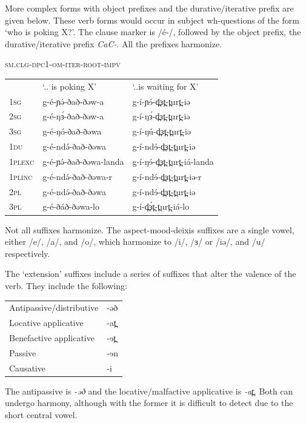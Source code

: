 More complex forms with object prefixes and the durative/iterative prefix are given below. These verb forms would occur in subject wh-questions of the form ‘who is poking X?’. The clause marker is /é-/, followed by the object prefix, the durative/iterative prefix \textit{CaC-}. All the prefixes harmonize. 

\ea \textsc{\textsc{sm.cl}g-dpc1-om-iter-root-impv}\\
\begin{tabular}[t]{lll}
&	‘.. is poking X’	&	‘..is waiting for X’\\
1\textsc{sg}	&	g-é-ɲə́-ðað-ðəw-a	&	g-í-ɲɘ́-d̪ɜt̪-t̪urt̪-iə\\
2\textsc{sg}	&	g-é-ŋɜ́-ðað-ðəw-a	&	g-í-ŋɜ́-d̪ɜt̪-t̪urt̪-iə\\
3\textsc{sg}	&	g-é-ŋó-ðað-ðəwa	&	g-í-ŋú-d̪ɜt̪-t̪urt̪-iə\\
1\textsc{du}	&	g-é-ndə́-ðað-ðəwa	&	g-í-ndɘ́-d̪ɜt̪-t̪urt̪-iə\\
1\textsc{plexc}	&	g-é-ɲə́-ðað-ðəwa-landa	&	g-í-ŋɘ́-d̪ɜt̪-t̪urt̪-iá-landa\\
1\textsc{plinc}	&	g-é-ndə́-ðað-ðəwa-r	&	g-í-ndɘ́-d̪ɜt̪-t̪urt̪-iə-r\\
2\textsc{pl}	&	g-é-ndə́-ðað-ðəwa	&	g-í-ndɘ́-d̪ɜt̪-t̪urt̪-iə\\
3\textsc{pl}	&	g-é-ðáð-ðəwa-lo	&	g-í-d̪ɜ́t̪-t̪urt̪-iá-lo\\
\end{tabular}
\z

Not all suffixes harmonize. The aspect-mood-deixis suffixes are a single vowel, either /e/, /a/, and /o/, which harmonize to /i/, /ɜ/ or /iə/, and /u/ respectively. 

The ‘extension’ suffixes include a series of suffixes that alter the valence of the verb. They include the following:

\ea
\begin{tabular}[t]{ll}
Antipassive/distributive		&	-əð\\
Locative applicative		&	-at̪\\
Benefactive applicative		&	-ɘt̪\\
Passive 					&	-ɘn\\
Causative					&	-i\\
\end{tabular}
\z

The antipassive is \textit{-əð} and the locative/malfactive applicative is \textit{-at̪}. Both can undergo harmony, although with the former it is difficult to detect due to the short central vowel.

